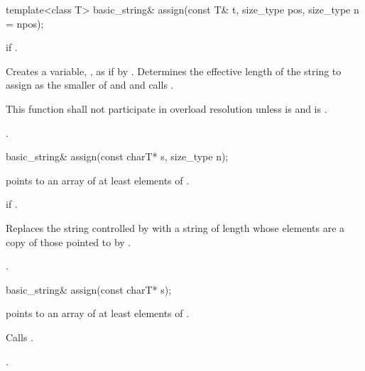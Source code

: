 %
\begin{itemdecl}
template<class T>
  basic_string& assign(const T& t, size_type pos, size_type n = npos);
\end{itemdecl}

\begin{itemdescr}
\pnum
\throws
{}
if
.

\pnum
\effects
Creates a variable, , as if by .
Determines the effective length  of the string to assign
as the smaller of  and 
and calls .

\pnum
\remarks
This function shall not participate in overload resolution
unless 
is  and  is .

\pnum
\returns
{}.
\end{itemdescr}

%
\begin{itemdecl}
basic_string& assign(const charT* s, size_type n);
\end{itemdecl}

\begin{itemdescr}
\pnum
\requires {} points to an array of at least  elements of .

\pnum
\throws {} if .

\pnum
\effects Replaces the string controlled by  with a string
of length  whose elements are a copy of those pointed to by .

\pnum
\returns
{}.
\end{itemdescr}

%
\begin{itemdecl}
basic_string& assign(const charT* s);
\end{itemdecl}

\begin{itemdescr}
\pnum
\requires {} points to an array of at least 
elements of .

\pnum
\effects Calls .

\pnum
\returns
{}.
\end{itemdescr}


